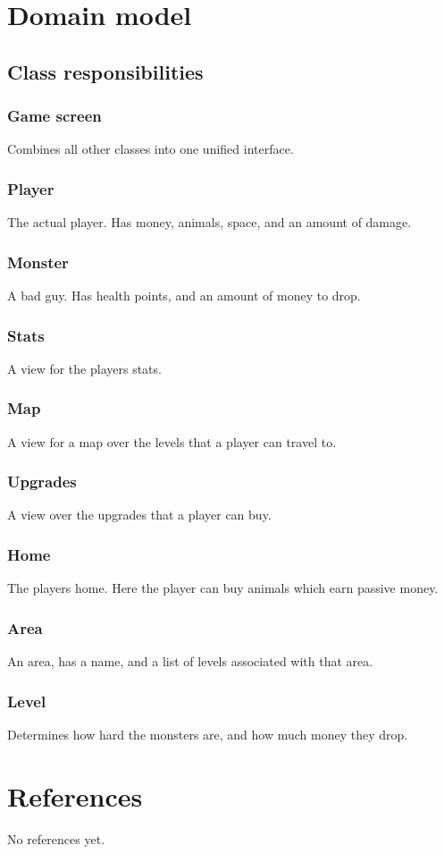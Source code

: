 \documentclass{article}
\begin{document}
\section{Domain model}

\subsection{Class responsibilities}
\subsubsection{Game screen}
Combines all other classes into one unified interface.
\subsubsection{Player}
The actual player. Has money, animals, space, and an amount of damage.
\subsubsection{Monster}
A bad guy. Has health points, and an amount of money to drop.
\subsubsection{Stats}
A view for the players stats.
\subsubsection{Map}
A view for a map over the levels that a player can travel to.
\subsubsection{Upgrades}
A view over the upgrades that a player can buy.
\subsubsection{Home}
The players home. Here the player can buy animals which earn passive money. 
\subsubsection{Area}
An area, has a name, and a list of levels associated with that area.
\subsubsection{Level}
Determines how hard the monsters are, and how much money they drop.
\section{References}
No references yet.
\end{document}
